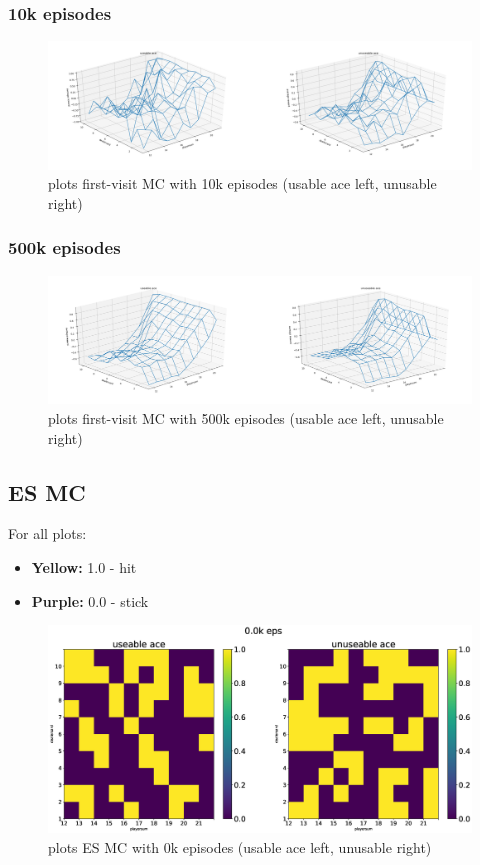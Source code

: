 \documentclass[11pt,a4paper]{article}
\begin{document}
\subsubsection{10k episodes}

\begin{figure}[h!]
  \includegraphics[width=.7\textwidth]{10k_eps.png}
  \centering
  \caption{plots first-visit MC with 10k episodes (usable ace left, unusable right)}
  \label{fig1}
\end{figure}

\subsubsection{500k episodes}

\begin{figure}[h!]
  \includegraphics[width=.7\textwidth]{500k_eps.png}
  \centering
  \caption{plots first-visit MC with 500k episodes (usable ace left, unusable right)}
  \label{fig2}
\end{figure}

\subsection{ES MC}

For all plots:
\begin{itemize}
  \item \textbf{Yellow:} 1.0 - hit
  \item \textbf{Purple:} 0.0 - stick
\end{itemize}


\begin{figure}[h!]
  \includegraphics[width=.7\textwidth]{es-v3-0k.eps}
  \centering
  \caption{plots ES MC with 0k episodes (usable ace left, unusable right)}
  \label{fig3}
\end{figure}
\end{document}
